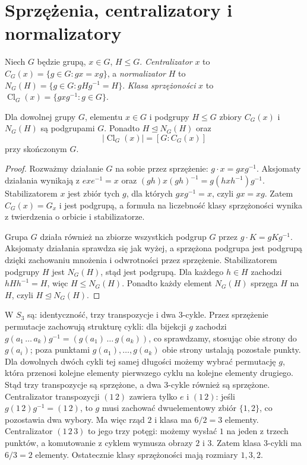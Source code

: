 \section{Sprzężenia, centralizatory i normalizatory}
\begin{definicja}
\label{aa:def:centralizator-normalizator}
Niech $G$ będzie grupą, $x\in G$, $H\le G$.
\emph{Centralizator} $x$ to
$C_G(x)=\{g\in G:gx=xg\}$, a \emph{normalizator} $H$ to
$N_G(H)=\{g\in G:gHg^{-1}=H\}$.
\emph{Klasa sprzężoności} $x$ to
$\operatorname{Cl}_G(x)=\{gxg^{-1}:g\in G\}$.
\end{definicja}

\begin{lemat}
\label{aa:lem:centralizator-normalizator}
Dla dowolnej grupy $G$, elementu $x\in G$ i podgrupy $H\le G$
zbiory $C_G(x)$ i $N_G(H)$ są podgrupami $G$.
Ponadto $H\trianglelefteq N_G(H)$ oraz
\[
 |\operatorname{Cl}_G(x)|=[G:C_G(x)]
\]
przy skończonym $G$.
\end{lemat}
\begin{proof}
Rozważmy działanie $G$ na sobie przez sprzężenie:
$g\cdot x=gxg^{-1}$.
Aksjomaty działania wynikają z
$e x e^{-1}=x$ oraz
$(gh)x(gh)^{-1}=g(hxh^{-1})g^{-1}$.
Stabilizatorem $x$ jest zbiór tych $g$, dla których
$gxg^{-1}=x$, czyli $gx=xg$.
Zatem $C_G(x)=G_x$ i jest podgrupą, a formuła
na liczebność klasy sprzężoności wynika z twierdzenia
o orbicie i stabilizatorze.

Grupa $G$ działa również na zbiorze wszystkich podgrup $G$
przez $g\cdot K=gKg^{-1}$.
Aksjomaty działania sprawdza się jak wyżej,
a sprzężona podgrupa jest podgrupą dzięki zachowaniu
mnożenia i odwrotności przez sprzężenie.
Stabilizatorem podgrupy $H$ jest $N_G(H)$, stąd jest podgrupą.
Dla każdego $h\in H$ zachodzi $hHh^{-1}=H$,
więc $H\le N_G(H)$. Ponadto każdy element $N_G(H)$
sprzęga $H$ na $H$, czyli $H\trianglelefteq N_G(H)$.
\end{proof}

\begin{przyklad}
W $S_3$ są: identyczność, trzy transpozycje i dwa $3$-cykle.
Przez sprzężenie permutacje zachowują strukturę cykli:
dla bijekcji $g$ zachodzi
$g(a_1\,\ldots\,a_k)g^{-1}=(g(a_1)\,\ldots\,g(a_k))$,
co sprawdzamy, stosując obie strony do $g(a_i)$;
poza punktami $g(a_1),\ldots,g(a_k)$ obie strony
ustalają pozostałe punkty. Dla dowolnych dwóch cykli
tej samej długości możemy wybrać permutację $g$, która
przenosi kolejne elementy pierwszego cyklu na kolejne
elementy drugiego. Stąd trzy transpozycje są sprzężone,
a dwa $3$-cykle również są sprzężone.
Centralizator transpozycji $(1\,2)$ zawiera tylko
$e$ i $(1\,2)$: jeśli $g(1\,2)g^{-1}=(1\,2)$,
to $g$ musi zachować dwuelementowy zbiór $\{1,2\}$,
co pozostawia dwa wybory. Ma więc rząd $2$ i klasa
ma $6/2=3$ elementy.
Centralizator $(1\,2\,3)$ to jego trzy potęgi:
możemy wysłać $1$ na jeden z trzech punktów,
a komutowanie z cyklem wymusza obrazy $2$ i $3$.
Zatem klasa $3$-cykli ma $6/3=2$ elementy.
Ostatecznie klasy sprzężoności mają rozmiary $1,3,2$.
\end{przyklad}

